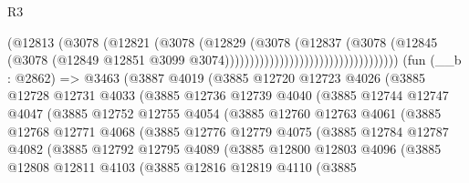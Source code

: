 \begin{lexlean}{R3}
\begin{coremodule}
                                                    (@12813
                                                      (@3078
                                                        (@12821
                                                          (@3078
                                                            (@12829
                                                              (@3078
                                                                (@12837
                                                                  (@3078
                                                                    (@12845
                                                                      (@3078
                                                                        (@12849
                                                                          @12851
                                                                          @3099
                                                                          @3074)))))))))))))))))))))))))))))))))))
    (fun (__b : @2862) =>
    @3463
      (@3887
        @4019
        (@3885
          @12720
          @12723
          @4026
          (@3885
            @12728
            @12731
            @4033
            (@3885
              @12736
              @12739
              @4040
              (@3885
                @12744
                @12747
                @4047
                (@3885
                  @12752
                  @12755
                  @4054
                  (@3885
                    @12760
                    @12763
                    @4061
                    (@3885
                      @12768
                      @12771
                      @4068
                      (@3885
                        @12776
                        @12779
                        @4075
                        (@3885
                          @12784
                          @12787
                          @4082
                          (@3885
                            @12792
                            @12795
                            @4089
                            (@3885
                              @12800
                              @12803
                              @4096
                              (@3885
                                @12808
                                @12811
                                @4103
                                (@3885
                                  @12816
                                  @12819
                                  @4110
                                  (@3885

\end{coremodule}
\end{lexlean}
